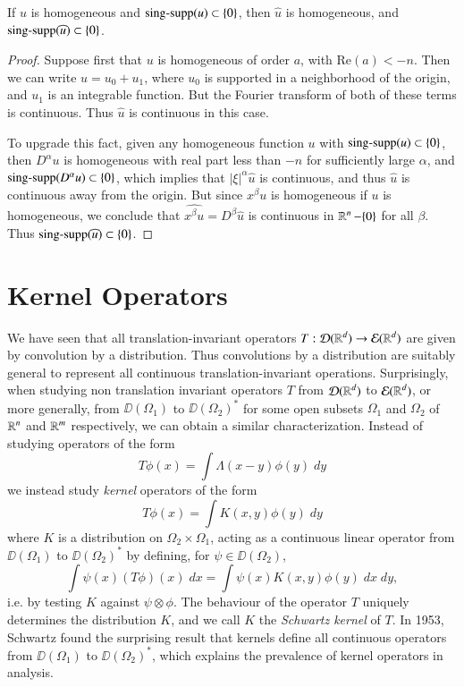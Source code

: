 \begin{lemma}
    If $u$ is homogeneous and $\operatorname{\text{sing-supp}}(u) \subset \{ 0 \}$, then $\widehat{u}$ is homogeneous, and $\operatorname{\text{sing-supp}}(\widehat{u}) \subset \{ 0 \}$.
\end{lemma}
\begin{proof}
    Suppose first that $u$ is homogeneous of order $a$, with $\text{Re}(a) < -n$. Then we can write $u = u_0 + u_1$, where $u_0$ is supported in a neighborhood of the origin, and $u_1$ is an integrable function. But the Fourier transform of both of these terms is continuous. Thus $\widehat{u}$ is continuous in this case.

    To upgrade this fact, given any homogeneous function $u$ with $\operatorname{\text{sing-supp}}(u) \subset \{ 0 \}$, then $D^\alpha u$ is homogeneous with real part less than $-n$ for sufficiently large $\alpha$, and $\operatorname{\text{sing-supp}}(D^\alpha u) \subset \{ 0 \}$, which implies that $|\xi|^\alpha \widehat{u}$ is continuous, and thus $\widehat{u}$ is continuous away from the origin. But since $x^\beta u$ is homogeneous if $u$ is homogeneous, we conclude that $\widehat{x^\beta u} = D^\beta \widehat{u}$ is continuous in $\operatorname{\mathbb{R}}^n - \{ 0 \}$ for all $\beta$. Thus $\operatorname{\text{sing-supp}}(\widehat{u}) \subset \{ 0 \}$.
\end{proof}


\section{Kernel Operators}

We have seen that all translation-invariant operators $T: \operatorname{\mathcal{D}}(\operatorname{\mathbb{R}}^d) \to \operatorname{\mathcal{E}}(\operatorname{\mathbb{R}}^d)$ are given by convolution by a distribution. Thus convolutions by a distribution are suitably general to represent all continuous translation-invariant operations. Surprisingly, when studying non translation invariant operators $T$ from $\operatorname{\mathcal{D}}(\operatorname{\mathbb{R}}^d)$ to $\operatorname{\mathcal{E}}(\operatorname{\mathbb{R}}^d)$, or more generally, from $\DD(\Omega_1)$ to $\DD(\Omega_2)^*$ for some open subsets $\Omega_1$ and $\Omega_2$ of $\operatorname{\mathbb{R}}^n$ and $\operatorname{\mathbb{R}}^m$ respectively, we can obtain a similar characterization. Instead of studying operators of the form
%
\[ T\phi(x) = \int \Lambda(x - y) \phi(y)\; dy \]
%
we instead study \emph{kernel} operators of the form
%
\[ T\phi(x) = \int K(x,y) \phi(y)\; dy \]
%
where $K$ is a distribution on $\Omega_2 \times \Omega_1$, acting as a continuous linear operator from $\DD(\Omega_1)$ to $\DD(\Omega_2)^*$ by defining, for $\psi \in \DD(\Omega_2)$,
%
\[ \int \psi(x) (T\phi)(x)\; dx = \int \psi(x) K(x,y) \phi(y)\; dx\; dy, \]
%
i.e. by testing $K$ against $\psi \otimes \phi$. The behaviour of the operator $T$ uniquely determines the distribution $K$, and we call $K$ the \emph{Schwartz kernel} of $T$. In 1953, Schwartz found the surprising result that kernels define all continuous operators from $\DD(\Omega_1)$ to $\DD(\Omega_2)^*$, which explains the prevalence of kernel operators in analysis.

